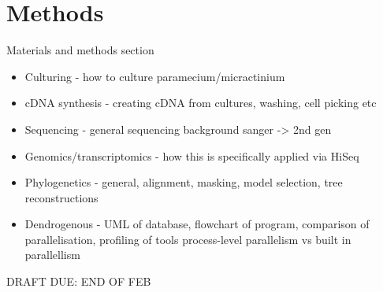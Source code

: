 \graphicspath{{chapters/2.Methods/figures}}

\chapter{Methods}

Materials and methods section

\begin{itemize}
    \item Culturing - how to culture paramecium/micractinium
    \item cDNA synthesis - creating cDNA from cultures, washing, cell picking etc
    \item Sequencing - general sequencing background sanger -> 2nd gen
    \item Genomics/transcriptomics - how this is specifically applied via HiSeq
    \item Phylogenetics - general, alignment, masking, model selection, tree reconstructions 
    \item Dendrogenous - UML of database, flowchart of program, comparison of parallelisation, profiling of tools process-level parallelism vs built in parallellism
\end{itemize}

%
%
%
%
%
%

DRAFT DUE: END OF FEB

